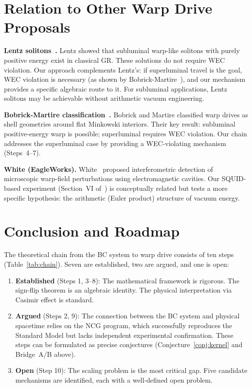 \documentclass[aps,prd,twocolumn,superscriptaddress,nofootinbib]{revtex4-2}
\begin{document}
\section{Relation to Other Warp Drive Proposals}
\label{sec:related}

\textbf{Lentz solitons~\cite{Lentz2021}.}
Lentz showed that subluminal warp-like solitons with purely
positive energy exist in classical GR. These solutions do not
require WEC violation. Our approach complements Lentz's:
if superluminal travel is the goal, WEC violation is necessary
(as shown by Bobrick-Martire~\cite{BobrickMartire2021}),
and our mechanism provides a specific algebraic route to it.
For subluminal applications, Lentz solitons may be achievable
without arithmetic vacuum engineering.

\textbf{Bobrick-Martire classification~\cite{BobrickMartire2021}.}
Bobrick and Martire classified warp drives as shell geometries
around flat Minkowski interiors. Their key result: subluminal
positive-energy warp is possible; superluminal requires WEC
violation. Our chain addresses the superluminal case by providing
a WEC-violating mechanism (Steps~4--7).

\textbf{White (EagleWorks).}
White~\cite{White2013} proposed interferometric detection of
microscopic warp-field perturbations using electromagnetic
cavities. Our SQUID-based experiment (Section~VI of~\cite{paper_A})
is conceptually related but tests a more specific hypothesis:
the arithmetic (Euler product) structure of vacuum energy.

\section{Conclusion and Roadmap}
\label{sec:conclusion}

The theoretical chain from the BC system to warp drive consists
of ten steps (Table~\ref{tab:chain}). Seven are established,
two are argued, and one is open:

\begin{enumerate}
  \item \textbf{Established} (Steps 1, 3--8): The mathematical
    framework is rigorous. The sign-flip theorem is an algebraic
    identity. The physical interpretation via Casimir effect is
    standard.

  \item \textbf{Argued} (Steps 2, 9): The connection between the
    BC system and physical spacetime relies on the NCG program,
    which successfully reproduces the Standard Model but lacks
    independent experimental confirmation. These steps can be
    formulated as precise conjectures
    (Conjecture~\ref{conj:kernel} and Bridge~A/B above).

  \item \textbf{Open} (Step 10): The scaling problem is the most
    critical gap. Five candidate mechanisms are identified, each
    with a well-defined open problem.
\end{enumerate}
\end{document}
